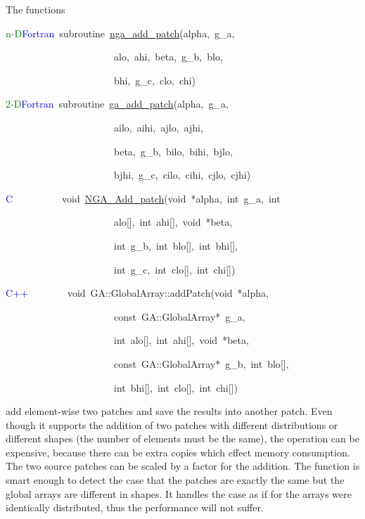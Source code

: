 The functions

\textcolor{green}{n-D}\textcolor{blue}{Fortran}~subroutine~\href{https://hpc.pnl.gov/globalarrays/api/f_op_api.html\#ga_add_patch}{nga\_{}add\_{}patch}(alpha,~g\_a,~

~~~~~~~~~~~~~~~~~~~~~~alo,~ahi,~beta,~g\_b,~blo,~

~~~~~~~~~~~~~~~~~~~~~~bhi,~g\_c,~clo,~chi)~

\textcolor{green}{2-D}\textcolor{blue}{Fortran}~subroutine~\href{https://hpc.pnl.gov/globalarrays/api/f_op_api.html\#ga_add_patch}{ga\_{}add\_{}patch}(alpha,~g\_a,~

~~~~~~~~~~~~~~~~~~~~~~ailo,~aihi,~ajlo,~ajhi,~

~~~~~~~~~~~~~~~~~~~~~~beta,~g\_b,~bilo,~bihi,~bjlo,~

~~~~~~~~~~~~~~~~~~~~~~bjhi,~g\_c,~cilo,~cihi,~cjlo,~cjhi)~

\textcolor{blue}{C}~~~~~~~~~~void~\href{https://hpc.pnl.gov/globalarrays/api/c_op_api.html\#ga_add_patch}{NGA\_{}Add\_{}patch}(void~{*}alpha,~int~g\_a,~int~

~~~~~~~~~~~~~~~~~~~~~~alo{[}{]},~int~ahi{[}{]},~void~{*}beta,~

~~~~~~~~~~~~~~~~~~~~~~int~g\_b,~int~blo{[}{]},~int~bhi{[}{]},~

~~~~~~~~~~~~~~~~~~~~~~int~g\_c,~int~clo{[}{]},~int~chi{[}{]})~

\textcolor{blue}{C++}~~~~~~~~void~GA::GlobalArray::addPatch(void~{*}alpha,~

~~~~~~~~~~~~~~~~~~~~~~const~GA::GlobalArray{*}~g\_a,~

~~~~~~~~~~~~~~~~~~~~~~int~alo{[}{]},~int~ahi{[}{]},~void~{*}beta,~

~~~~~~~~~~~~~~~~~~~~~~const~GA::GlobalArray{*}~g\_b,~int~blo{[}{]},~

~~~~~~~~~~~~~~~~~~~~~~int~bhi{[}{]},~int~clo{[}{]},~int~chi{[}{]})~

add element-wise two patches and save the results into another patch.
Even though it supports the addition of two patches with different
distributions or different shapes (the number of elements must be
the same), the operation can be expensive, because there can be extra
copies which effect memory consumption. The two source patches can
be scaled by a factor for the addition. The function is smart enough
to detect the case that the patches are exactly the same but the global
arrays are different in shapes. It handles the case as if for the
arrays were identically distributed, thus the performance will not
suffer.

